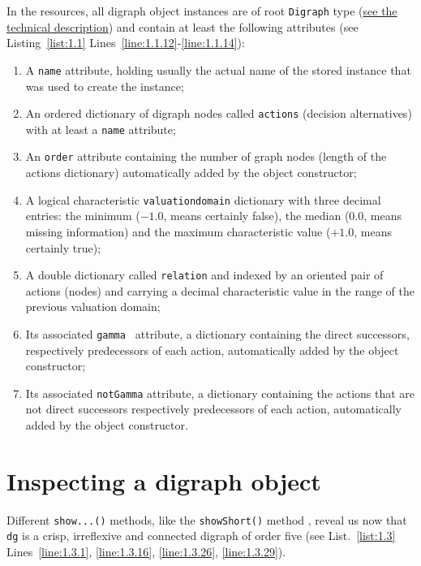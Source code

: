 In the \Digraph resources, all digraph object instances are of root \texttt{Digraph} type (\href{https://digraph3.readthedocs.io/en/latest/techDoc.html#organisation-of-the-digraph3-modules}{see the technical description}) and contain at least the following attributes (see Listing~\vref{list:1.1}  Lines~\ref{line:1.1.12}-\ref{line:1.1.14}):
\begin{enumerate}[leftmargin=0.5cm,listparindent=0em,nosep]
\item A \texttt{name} attribute, holding usually the actual name of the stored instance that was used to create the instance;
\item An ordered dictionary of digraph nodes called \texttt{actions} (decision alternatives) with at least a \texttt{name} attribute;
\item An \texttt{order} attribute containing the number of graph nodes (length of the actions dictionary) automatically added by the object constructor;
\item  A logical characteristic \texttt{valuationdomain} dictionary with three decimal entries: the minimum ($-1.0$, means certainly false), the median ($0.0$, means missing information) and the maximum characteristic value ($+1.0$, means certainly true);
\item A double dictionary called \texttt{relation} and indexed by an oriented pair of actions (nodes) and carrying a decimal characteristic value in the range of the previous valuation domain;
\item Its associated \texttt{gamma } attribute, a dictionary containing the direct successors, respectively predecessors of each action, automatically added by the object constructor;
\item Its associated \texttt{notGamma} attribute, a dictionary containing the actions that are not direct successors respectively predecessors of each action, automatically added by the object constructor.
\end{enumerate}

\section{Inspecting a digraph object}
\label{sec:1.4}

Different \texttt{show...()} methods, like the \texttt{showShort()} method , reveal us now that \texttt{dg} is a crisp, irreflexive and connected digraph of order five (see List.~\vref{list:1.3}  Lines~\ref{line:1.3.1}, \ref{line:1.3.16}, \ref{line:1.3.26}, \ref{line:1.3.29}).

